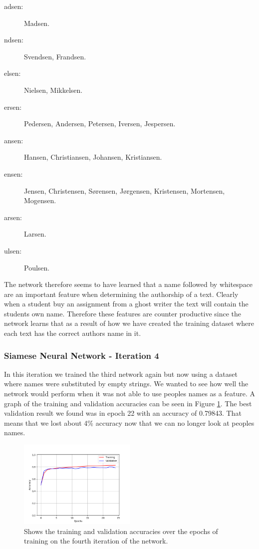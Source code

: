\begin{description}
    \item[adsen:] Madsen.
    \item[ndsen:] Svendsen, Frandsen.
    \item[elsen:] Nielsen, Mikkelsen.
    \item[ersen:] Pedersen, Andersen, Petersen, Iversen, Jespersen.
    \item[ansen:] Hansen, Christiansen, Johansen, Kristiansen.
    \item[ensen:] Jensen, Christensen, S\o rensen, J\o rgensen, Kristensen,
        Mortensen, Mogensen.
    \item[arsen:] Larsen.
    \item[ulsen:] Poulsen.
\end{description}

The network therefore seems to have learned that a name followed by whitespace
are an important feature when determining the authorship of a text. Clearly when
a student buy an assignment from a ghost writer the text will contain the
students own name. Therefore these features are counter productive since the
network learns that as a result of how we have created the training dataset
where each text has the correct authors name in it.


\subsubsection{Siamese Neural Network - Iteration 4}

In this iteration we trained the third network again but now using a dataset
where names were substituted by empty strings. We wanted to see how well the
network would perform when it was not able to use peoples names as a feature.
A graph of the training and validation accuracies can be seen in Figure
\ref{fig:network_4_accuracies}. The best validation result we found was in epoch
22 with an accuracy of 0.79843. That means that we lost about 4\% accuracy now
that we can no longer look at peoples names.

\begin{figure}
    \centering
    \includegraphics[width=0.5\textwidth]{./pictures/experiments/network_4_accuracies.png}
    \caption{Shows the training and validation accuracies over the epochs of
        training on the fourth iteration of the network.}
    \label{fig:network_4_accuracies}
\end{figure}

